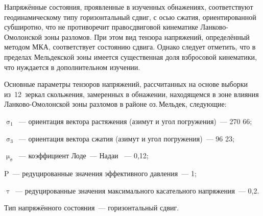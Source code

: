 
\clearpage
Напряжённые состояния, проявленные в изученных обнажениях, соответствуют
геодинамическому типу горизонтальный сдвиг, с осью сжатия, ориентированной
субширотно, что не противоречит правосдвиговой кинематике Ланково-Омолонской
зоны разломов. При этом вид тензора напряжений, определённый методом МКА,
соответствует состоянию сдвига. Однако следует отметить, что в пределах
Мельдекской зоны имеется существенная доля взбросовой кинематики, что нуждается
в дополнительном изучении.




Основные параметры тензоров напряжений, рассчитанных на основе выборки из~12~зеркал скольжения, замеренных в обнажении, находящемся в зоне влияния Ланково-Омо\-лон\-ской зоны разломов в районе оз.\,Мельдек, следующие:

\begin{description}[noitemsep]\vspace{-10pt}
\item $\upsigma_1$~--- ориентация вектора растяжения (азимут и угол погружения)~--- 270\dg\,\angl\,66;
\item $\upsigma_3$~--- ориентация вектора сжатия (азимут и угол погружения)~--- 96\dg\,\angl\,23;
\item $\upmu_\upsigma$~--- коэффициент Лоде~--- Надаи ~--- 0,12;
\item P~--- редуцированные значения эффективного давления~--- 1;
\item $\uptau$~--- редуцированные значения максимального касательного напряжения~--- 0,2.
\item Тип напряжённого состояния~--- горизонтальный сдвиг.
\end{description}



%



